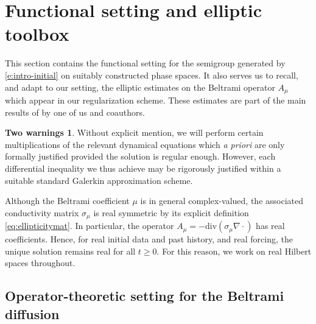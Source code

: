 \documentclass[12pt,leqno]{amsart}
\theoremstyle{definition}
\newtheorem*{warn*}{Two  warnings}
\numberwithin{equation}{section}
\numberwithin{figure}{section}
\begin{document}
 

 
 
\section{Functional setting and elliptic toolbox}\label{sec:functional-setting}
 

This section contains the functional setting for the semigroup generated by \eqref{e:intro-initial} on suitably constructed phase spaces. It also serves us to recall, and adapt to our setting, the elliptic estimates on the Beltrami operator $A_\mu$ which appear in our regularization scheme. These estimates are part of the main results of \cite{DPF} by one of us and coauthors.
\begin{warn*}
Without explicit mention, we will perform certain multiplications of the relevant dynamical equations which \emph{a priori} are only formally justified provided the solution is regular enough. However, each differential inequality we thus achieve may be rigorously justified within a suitable standard Galerkin approximation scheme.


 
Although the Beltrami coefficient $\mu$ is in general complex-valued, the associated
conductivity matrix $\sigma_\mu$ is real symmetric by its explicit
definition \eqref{eq:ellipticitymat}. In particular, the operator
$A_\mu=-\mathrm{div}(\sigma_\mu\nabla\cdot)$ has real coefficients. 
Hence, for real initial data and past history, and real forcing, the unique solution remains
real for all $t\ge0$. For this reason, we work on real Hilbert spaces
throughout. \end{warn*}

\subsection{Operator-theoretic setting for the Beltrami diffusion}\label{subsec:operator-setting}
 
\end{document}
